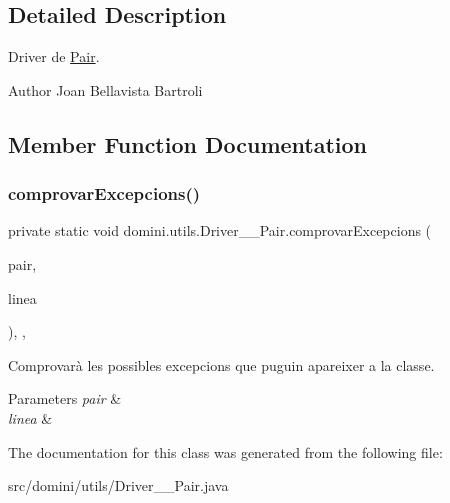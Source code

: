 \subsection{Detailed Description}
Driver de \hyperlink{classdomini_1_1utils_1_1Pair}{Pair}. 

\begin{DoxyAuthor}{Author}
Joan Bellavista Bartroli 
\end{DoxyAuthor}


\subsection{Member Function Documentation}
\mbox{\label{classdomini_1_1utils_1_1Driver____Pair_a21b1c7ef4260412672ce94eb68b34d50}} 
\subsubsection{\texorpdfstring{comprovar\+Excepcions()}{comprovarExcepcions()}}
{\footnotesize\ttfamily private static void domini.\+utils.\+Driver\+\_\+\+\_\+\+Pair.\+comprovar\+Excepcions (\begin{DoxyParamCaption}\item[{\hyperlink{classdomini_1_1utils_1_1Pair}{Pair}}]{pair,  }\item[{String}]{linea }\end{DoxyParamCaption})\hspace{0.3cm}{\ttfamily [inline]}, {\ttfamily [static]}, {\ttfamily [private]}}



Comprovarà les possibles excepcions que puguin apareixer a la classe. 


\begin{DoxyParams}{Parameters}
{\em pair} & \\
\hline
{\em linea} & \\
\hline
\end{DoxyParams}


The documentation for this class was generated from the following file\+:\begin{DoxyCompactItemize}
\item 
src/domini/utils/Driver\+\_\+\+\_\+\+Pair.\+java\end{DoxyCompactItemize}
